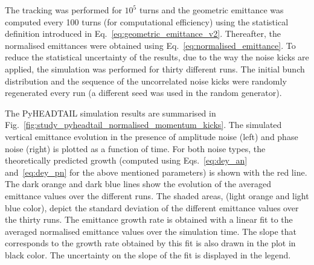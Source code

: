 The tracking was performed for $10^5$ turns and the geometric emittance was computed every 100 turns (for computational efficiency) using the statistical definition introduced in Eq.~\eqref{eq:geometric_emittance_v2}. Thereafter, the normalised emittances were obtained using Eq.~\eqref{eq:normalised_emittance}. To reduce the statistical uncertainty of the results, due to the way the noise kicks are applied, the simulation was performed for thirty different runs. The initial bunch distribution and the sequence of the uncorrelated noise kicks were randomly regenerated every run (a different seed was used in the random generator).

The PyHEADTAIL simulation results are summarised in Fig.~\ref{fig:study_pyheadtail_normalised_momentum_kicks}. The simulated vertical emittance evolution in the presence of amplitude noise (left) and phase noise (right) is plotted as a function of time. For both noise types, the theoretically predicted growth (computed using Eqs.~\eqref{eq:dey_an} and~\eqref{eq:dey_pn} for the above mentioned parameters) is shown with the red line. The dark orange and dark blue lines show the evolution of the averaged emittance values over the different runs. The shaded areas, (light orange and light blue color), depict the standard deviation of the different emittance values over the thirty runs. The emittance growth rate is obtained with a linear fit to the averaged normalised emittance values over the simulation time. The slope that corresponds to the growth rate obtained by this fit is also drawn in the plot in black color. The uncertainty on the slope of the fit is displayed in the legend.


